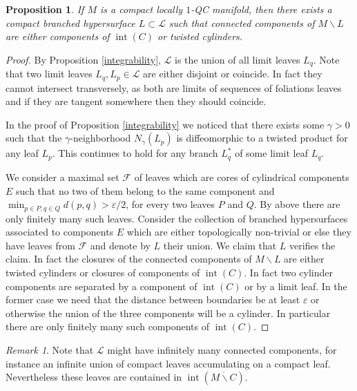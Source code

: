 \documentclass[JEP,XML,SOM,Unicode]{cedram}
\let\mathcal\mathscr
\let\moins\smallsetminus
\DeclareMathOperator{\inte}{int}
\newtheorem{proposition}[theorem]{Proposition}
\theoremstyle{definition}
\theoremstyle{remark}
\newtheorem{remark}[theorem]{Remark}
\numberwithin{equation}{section}
\begin{document}
\begin{proposition}\label{boundary}
If $M$ is a compact locally $1$-QC manifold,
then there exists a compact branched hypersurface $L\subset \mathcal L$ such that
connected components of $M\moins L$ are either components of $\inte (C)$ or twisted cylinders.
\end{proposition}
\begin{proof}
By Proposition \ref{integrability}, $\mathcal L$ is the union of all limit leaves $L_q$.
Note that two limit leaves $L_q, L_p\in \mathcal L$ are either disjoint or coincide.
In fact they cannot intersect transversely, as both are limits of sequences of
foliations leaves and if they are tangent somewhere then they should coincide.

In the proof of Proposition \ref{integrability} we noticed that there exists some $\gamma >0$
such that the $\gamma$-neighborhood $N_{\gamma}(L_p)$ is diffeomorphic to a twisted product for any
leaf $L_p$. This continues to hold for any branch $L_q^*$ of some limit leaf $L_q$.

We consider a maximal set $\mathcal F$ of leaves which are cores of cylindrical components $E$ such that
no two of them belong to the same component and $\min_{p\in P, q\in Q} d(p,q) > \varepsilon/2$, for every two
leaves $P$ and $Q$. By above there are only finitely many such leaves.
Consider the collection of branched hypersurfaces associated to components $E$ which are either topologically non-trivial
or else they have leaves from $\mathcal F$ and denote by $L$ their union.
We claim that $L$ verifies the claim. In fact the closures of the connected components of $M\moins L$ are either twisted cylinders or closures of components of $\inte (C)$. In fact two cylinder components are separated by a component of $\inte (C)$
or by a limit leaf. In the former case we need that the distance between boundaries be at least $\varepsilon$
or otherwise the union of the three components will be a cylinder. In particular there are only finitely many
such components of $\inte (C)$.
\end{proof}

\begin{remark}
Note that $\mathcal L$ might have infinitely many connected
components, for instance an infinite union of compact leaves accumulating on
a compact leaf. Nevertheless these leaves are contained in $\inte (\overline{M\moins C})$.
\end{remark}
\end{document}
